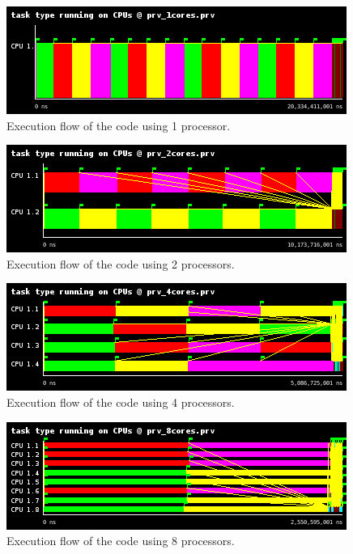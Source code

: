 \documentclass[12pt, a4paper]{article}
\begin{document}
\begin{figure}[H]
	\centering
	\includegraphics[scale=0.75]{./images/S1_scalability/S1_scalability_1}
	
	\label{fig_ann:S1_scalability_1}
	\caption{Execution flow of the code using 1 processor.}
\end{figure}





\begin{figure}[H]
	\centering
	\includegraphics[scale=0.75]{./images/S1_scalability/S1_scalability_2}
	
	\label{fig_ann:S1_scalability_2}
	\caption{Execution flow of the code using 2 processors.}
\end{figure}





\begin{figure}[H]
	\centering
	\includegraphics[scale=0.75]{./images/S1_scalability/S1_scalability_4}
	
	\label{fig_ann:S1_scalability_4}
	\caption{Execution flow of the code using 4 processors.}
\end{figure}





\begin{figure}[H]
	\centering
	\includegraphics[scale=0.75]{./images/S1_scalability/S1_scalability_8}
	
	\label{fig_ann:S1_scalability_8}
	\caption{Execution flow of the code using 8 processors.}
\end{figure}
\end{document}
